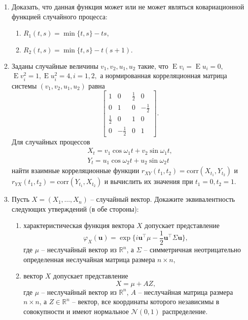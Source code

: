 \documentclass[a4paper,14pt]{extreport}
\renewcommand{\=}[1]{\stackrel{#1}{=}} %
\newcommand{\Expect}{\mathop{{}\mathrm{E}}}
\begin{document}
\begin{enumerate}

\item Доказать, что данная функция может или не может
являться ковариационной функцией случайного процесса:
	\begin{enumerate}
		\item $R_1(t, s) = \min\{t, s\} - ts$,
		\item $R_2(t, s) = \min\{t, s\} - t(s + 1).$
	\end{enumerate}

\item Заданы случайные величины $v_1, v_2, u_1, u_2$ 
такие, что $\Expect v_i = \Expect u_i = 0,$
$\Expect v^2_i = 1, \Expect u^2_i = 4, i=1,2,$ 
а нормированная корреляционная матрица системы 
$(v_1, v_2, u_1, u_2)$ равна
\[
\begin{bmatrix}
    1 & 0 & \frac{1}{2} & 0 \\
    0 & 1 & 0 & -\frac{1}{2} \\
    \frac{1}{2} & 0 & 1 & 0 \\
    0 & -\frac{1}{2} & 0 & 1
\end{bmatrix}.
\]
Для случайных процессов
\begin{align*}
X_t = v_1 \cos \omega_1 t + v_2 \sin \omega_1 t, \\
Y_t = u_1 \cos \omega_2 t + u_2 \sin \omega_2 t
\end{align*}
найти взаимные корреляционные функции 
$r_{XY}(t_1, t_2) = \mathrm{corr}(X_{t_1}, Y_{t_2})$
и $r_{YX}(t_1, t_2) = \mathrm{corr}(Y_{t_1}, X_{t_2})$
и вычислить их значения при $t_1 = 0, t_2 = 1.$

\item Пусть $X = (X_1, \ldots, X_n)$ -- случайный вектор.
Докажите эквивалентность следующих утверждений
(в обе стороны):
	\begin{enumerate}
		\item характеристическая функция вектора $X$ допускает представление
		\begin{equation*}
	    \varphi_X(\mathbf{u}) = \exp\big\{
	    	i \mathbf{u}^{\intercal} \mu - 
	    		\frac 1 2 \mathbf{u}^{\intercal} \Sigma \mathbf{u} 
	    	\big\},
		\end{equation*}
		где $\mu$ -- неслучайный вектор из $\mathbb{R}^n$,
		а $\Sigma$ -- симметричная неотрицательно определенная неслучайная
		матрица размера $n \times n$,

		\item вектор $X$ допускает представление
		\begin{equation*}
		    X = \mu + AZ,
		\end{equation*}
		где $\mu$ -- неслучайный вектор из $\mathbb{R}^n$,
		$A$ -- неслучайная матрица размера $n \times n$,
		а $Z \in \mathbb{R}^n$ -- вектор, все координаты 
		которого независимы в совокупности и имеют нормальное $\mathcal{N}(0, 1)$
		распределение.
	\end{enumerate}


\end{enumerate}
\end{document}
